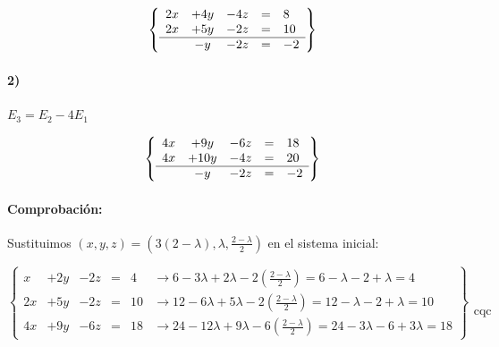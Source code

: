\documentclass[palatino,nosec]{Docencia}
\begin{document}
\begin{problem}
\[
\left\{\begin{array}{lcccl}
2x&+4y&-4z&=&8\\
2x&+5y&-2z&=&10\\
\hline
&-y&-2z&=&-2 
\end{array}\right\}
\]

\paragraph{2)} $E_3=E_2-4E_1$

\[
\left\{\begin{array}{lcccl}
4x&+9y&-6z&=&18\\
4x&+10y&-4z&=&20\\
\hline
&-y&-2z&=&-2 
\end{array}\right\}
\]


\paragraph*{Comprobación:} Sustituimos $(x,y,z) = \left(3(2-λ),λ,\frac{2-λ}{2}\right)$ en el sistema inicial:


\[
\left\{\begin{array}{lcccll}
x&+2y&-2z&=&4 &\to 6-3λ + 2λ - 2\displaystyle\left(\frac{2-λ}{2}\right) = 6-λ-2+λ = 4\\
2x&+5y&-2z&=&10 &\to 12-6λ +5λ - 2\displaystyle\left(\frac{2-λ}{2}\right) = 12-λ-2+λ = 10\\
4x&+9y&-6z&=&18 &\to 24-12λ + 9λ - 6\displaystyle\left(\frac{2-λ}{2}\right) = 24-3λ-6+3λ = 18
\end{array}\right\}\begin{array}{c}\\\\\\\\\text{cqc}\end{array}
\]

\end{problem}
\end{document}
